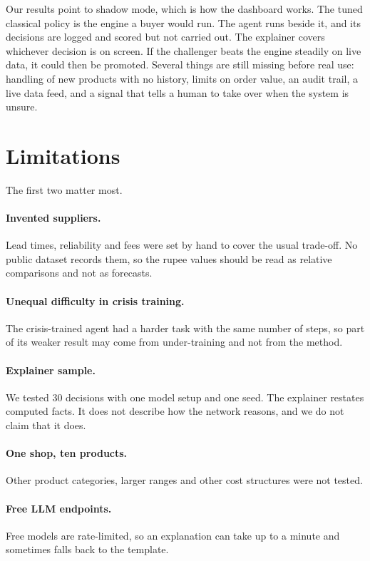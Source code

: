 \documentclass[10pt,twocolumn]{article}
\begin{document}
Our results point to shadow mode, which is how the dashboard works. The tuned
classical policy is the engine a buyer would run. The agent runs beside it, and
its decisions are logged and scored but not carried out. The explainer covers
whichever decision is on screen. If the challenger beats the engine steadily on
live data, it could then be promoted. Several things are still missing before
real use: handling of new products with no history, limits on order value, an
audit trail, a live data feed, and a signal that tells a human to take over
when the system is unsure.

\section{Limitations}

The first two matter most.

\paragraph{Invented suppliers.}
Lead times, reliability and fees were set by hand to cover the usual
trade-off. No public dataset records them, so the rupee values should be read as
relative comparisons and not as forecasts.

\paragraph{Unequal difficulty in crisis training.}
The crisis-trained agent had a harder task with the same number of steps, so
part of its weaker result may come from under-training and not from the method.

\paragraph{Explainer sample.}
We tested 30 decisions with one model setup and one seed. The explainer
restates computed facts. It does not describe how the network reasons, and we
do not claim that it does.

\paragraph{One shop, ten products.}
Other product categories, larger ranges and other cost structures were not
tested.

\paragraph{Free LLM endpoints.}
Free models are rate-limited, so an explanation can take up to a minute and
sometimes falls back to the template.
\end{document}
